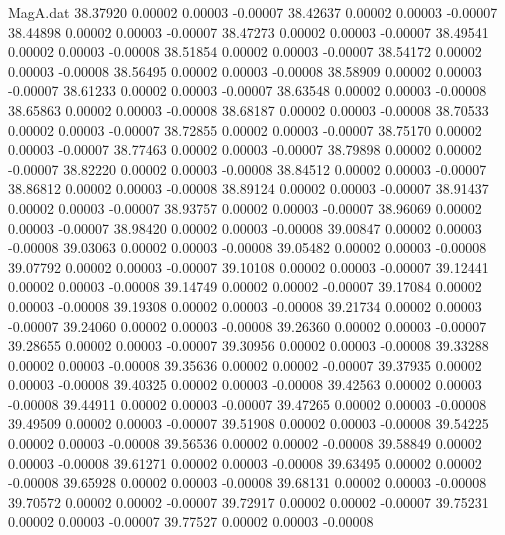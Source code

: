 \begin{filecontents}{MagA.dat}
  38.37920    0.00002    0.00003   -0.00007
  38.42637    0.00002    0.00003   -0.00007
  38.44898    0.00002    0.00003   -0.00007
  38.47273    0.00002    0.00003   -0.00007
  38.49541    0.00002    0.00003   -0.00008
  38.51854    0.00002    0.00003   -0.00007
  38.54172    0.00002    0.00003   -0.00008
  38.56495    0.00002    0.00003   -0.00008
  38.58909    0.00002    0.00003   -0.00007
  38.61233    0.00002    0.00003   -0.00007
  38.63548    0.00002    0.00003   -0.00008
  38.65863    0.00002    0.00003   -0.00008
  38.68187    0.00002    0.00003   -0.00008
  38.70533    0.00002    0.00003   -0.00007
  38.72855    0.00002    0.00003   -0.00007
  38.75170    0.00002    0.00003   -0.00007
  38.77463    0.00002    0.00003   -0.00007
  38.79898    0.00002    0.00002   -0.00007
  38.82220    0.00002    0.00003   -0.00008
  38.84512    0.00002    0.00003   -0.00007
  38.86812    0.00002    0.00003   -0.00008
  38.89124    0.00002    0.00003   -0.00007
  38.91437    0.00002    0.00003   -0.00007
  38.93757    0.00002    0.00003   -0.00007
  38.96069    0.00002    0.00003   -0.00007
  38.98420    0.00002    0.00003   -0.00008
  39.00847    0.00002    0.00003   -0.00008
  39.03063    0.00002    0.00003   -0.00008
  39.05482    0.00002    0.00003   -0.00008
  39.07792    0.00002    0.00003   -0.00007
  39.10108    0.00002    0.00003   -0.00007
  39.12441    0.00002    0.00003   -0.00008
  39.14749    0.00002    0.00002   -0.00007
  39.17084    0.00002    0.00003   -0.00008
  39.19308    0.00002    0.00003   -0.00008
  39.21734    0.00002    0.00003   -0.00007
  39.24060    0.00002    0.00003   -0.00008
  39.26360    0.00002    0.00003   -0.00007
  39.28655    0.00002    0.00003   -0.00007
  39.30956    0.00002    0.00003   -0.00008
  39.33288    0.00002    0.00003   -0.00008
  39.35636    0.00002    0.00002   -0.00007
  39.37935    0.00002    0.00003   -0.00008
  39.40325    0.00002    0.00003   -0.00008
  39.42563    0.00002    0.00003   -0.00008
  39.44911    0.00002    0.00003   -0.00007
  39.47265    0.00002    0.00003   -0.00008
  39.49509    0.00002    0.00003   -0.00007
  39.51908    0.00002    0.00003   -0.00008
  39.54225    0.00002    0.00003   -0.00008
  39.56536    0.00002    0.00002   -0.00008
  39.58849    0.00002    0.00003   -0.00008
  39.61271    0.00002    0.00003   -0.00008
  39.63495    0.00002    0.00002   -0.00008
  39.65928    0.00002    0.00003   -0.00008
  39.68131    0.00002    0.00003   -0.00008
  39.70572    0.00002    0.00002   -0.00007
  39.72917    0.00002    0.00002   -0.00007
  39.75231    0.00002    0.00003   -0.00007
  39.77527    0.00002    0.00003   -0.00008

\end{filecontents}
